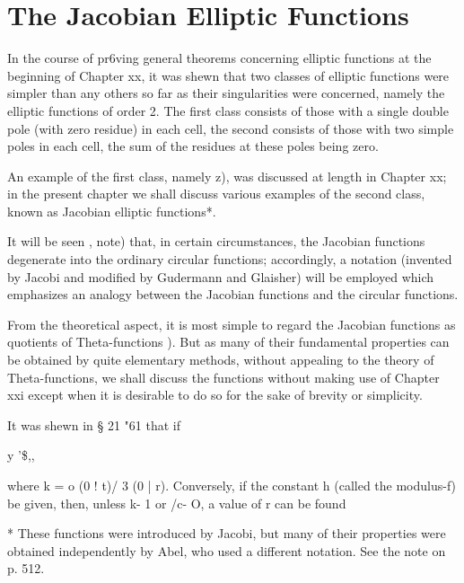 \chapter{The Jacobian Elliptic Functions} 


In the course of pr6ving general theorems concerning elliptic
functions at the beginning of Chapter xx, it was shewn that two
classes of elliptic functions were simpler than any others so far as
their singularities were concerned, namely the elliptic functions of
order 2. The first class consists of those with a single double pole
(with zero residue) in each cell, the second consists of those with
two simple poles in each cell, the sum of the residues at these poles
being zero.

An example of the first class, namely z), was discussed at length in
Chapter xx; in the present chapter we shall discuss various examples
of the second class, known as Jacobian elliptic functions*.

It will be seen , note) that, in certain circumstances, the
Jacobian functions degenerate into the ordinary circular functions;
accordingly, a notation (invented by Jacobi and modified by Gudermann
and Glaisher) will be employed which emphasizes an analogy between the
Jacobian functions and the circular functions.

From the theoretical aspect, it is most simple to regard the Jacobian
functions as quotients of Theta-functions ). But as many of
their fundamental properties can be obtained by quite elementary
methods, without appealing to the theory of Theta-functions, we shall
discuss the functions without making use of Chapter xxi except when it
is desirable to do so for the sake of brevity or simplicity.

It was shewn in
§ 21 "61 that if

y '\$,,%

where k = o (0 ! t)/ 3 (0 | r). Conversely, if the constant h (called
the modulus-f) be given, then, unless k- 1 or /c- O, a value of r can
be found

* These functions were introduced by Jacobi, but many of their
properties were obtained independently by Abel, who used a different
notation. See the note on p. 512.

